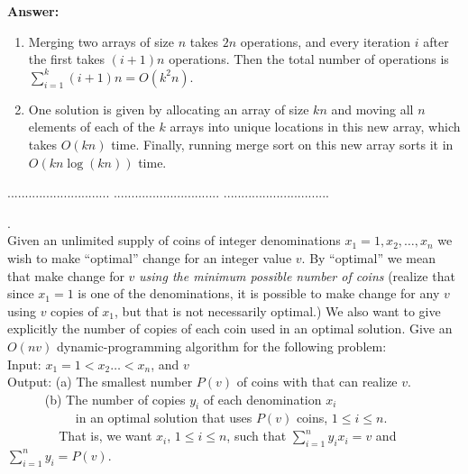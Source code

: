 \documentclass[a4paper,11pt]{article}
\begin{document}
\noindent
{\bf Answer:}
\begin{enumerate}[label=(\alph*)]
    \item
        Merging two arrays of size $n$ takes $2n$ operations, and every iteration $i$ after the first takes $(i + 1)n$ operations. Then the total number of operations is $\sum_{i = 1}^k (i + 1)n = O(k^2 n)$.
    \item
        One solution is given by allocating an array of size $kn$ and moving all $n$ elements of each of the $k$ arrays into unique locations in this new array, which takes $O(kn)$ time. Finally, running merge sort on this new array sorts it in $O(kn \log(kn))$ time.
\end{enumerate}



\pagebreak
{} $.............................$
 $..............................$
          $..............................$\\

\bigskip

.\\
Given an unlimited supply of coins of integer denominations $x_1 = 1, x_2 , \ldots , x_n$ we wish to make ``optimal'' change for
an integer value $v$. By ``optimal'' we mean that make change for $v$ {\em using  the minimum possible number of coins} 
(realize that since $x_1 =1$ is one of the denominations, it is possible to make change for any $v$
using $v$ copies of $x_1$, but that is not necessarily optimal.)
We also want to give explicitly the number of copies of each coin used in an optimal solution.
Give an $O(n v)$ dynamic-programming algorithm for the following problem:\\
Input: $x_1 = 1 < x_2 \ldots < x_n$, and $v$\\
Output: (a) The smallest number $P(v)$ of coins with  that can realize $v$.\\
$~~~~~~~~~~~~$ (b) The number of copies $y_i$ of each denomination $x_i$\\
$~~~~~~~~~~~~~~~~~~~~~~~$ in an optimal solution that uses $P(v)$ coins, $1 \leq i \leq n$.\\
$~~~~~~~~~~~~~~~~~$ That is, we want $x_i$,  $1 \leq i \leq n$, such that $\sum_{i=1}^n y_i x_i = v$ and $ \sum_{i=1}^n y_i =P(v)$.\\
\end{document}
